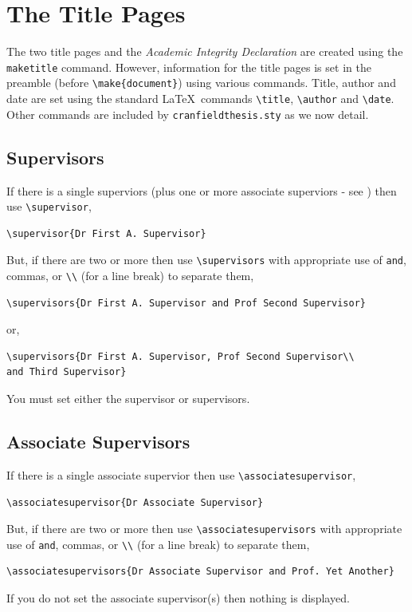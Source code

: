 \documentclass[12pt,oneside]{book} %
\begin{document}
\section{The Title Pages}
\label{sec:TitlePages}
The two title pages and the {\em Academic Integrity Declaration} are created using the \linebreak\verb#maketitle# command.  However, information for the title pages is set in the preamble (before \verb#\make{document}#) using various commands. Title, author and date are set  using the standard \LaTeX\ commands \verb#\title#, \verb#\author# and \verb#\date#. Other commands are included by \verb#cranfieldthesis.sty# as we now detail.

\subsection{Supervisors}
\label{sec:Supervisor}
If there is a single superviors (plus one or more associate superviors - see ) then use \verb#\supervisor#,
\begin{verbatim}
\supervisor{Dr First A. Supervisor}
\end{verbatim}
But, if there are two or more then use \verb#\supervisors# with appropriate use of {\tt and}, commas, or \verb#\\# (for a line break)  to separate them,
\begin{verbatim}
\supervisors{Dr First A. Supervisor and Prof Second Supervisor}
\end{verbatim}
or,
\begin{verbatim}
\supervisors{Dr First A. Supervisor, Prof Second Supervisor\\ 
and Third Supervisor}
\end{verbatim}
You must set either the supervisor or supervisors. 

\subsection{Associate Supervisors}
\label{sec:AssociateSupervisor}
If there is a single associate supervior then use \verb#\associatesupervisor#,
\begin{verbatim}
\associatesupervisor{Dr Associate Supervisor}
\end{verbatim}
But, if there are two or more then use \verb#\associatesupervisors# with appropriate use of {\tt and}, commas, or \verb#\\# (for a line break)  to separate them,
\begin{verbatim}
\associatesupervisors{Dr Associate Supervisor and Prof. Yet Another}
\end{verbatim}
If you do not set the associate supervisor(s) then nothing is displayed.
\end{document}
